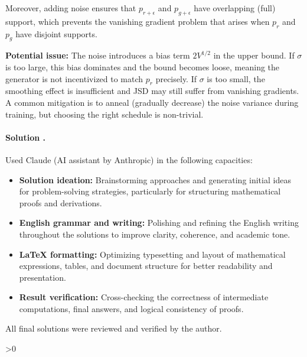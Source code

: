 \documentclass{article}
\newcounter{placeholderCount}
\newcounter{solutionCount}
\newcommand{\solution}[1]{
    \stepcounter{solutionCount}
    \paragraph{Solution \thesolutionCount.}
    {
        #1
    }
}
\begin{document}
{\begin{enumerate}
        Moreover, adding noise ensures that $p_{r+\epsilon}$ and $p_{g+\epsilon}$ have overlapping (full) support, which prevents the vanishing gradient problem that arises when $p_r$ and $p_g$ have disjoint supports.

        \textbf{Potential issue:} The noise introduces a bias term $2V^{1/2}$ in the upper bound. If $\sigma$ is too large, this bias dominates and the bound becomes loose, meaning the generator is not incentivized to match $p_r$ precisely. If $\sigma$ is too small, the smoothing effect is insufficient and JSD may still suffer from vanishing gradients. A common mitigation is to anneal (gradually decrease) the noise variance during training, but choosing the right schedule is non-trivial.
    \end{enumerate}
}


\solution{
    Used Claude (AI assistant by Anthropic) in the following capacities:
    \begin{itemize}
        \item \textbf{Solution ideation:} Brainstorming approaches and generating initial ideas for problem-solving strategies, particularly for structuring mathematical proofs and derivations.
        \item \textbf{English grammar and writing:} Polishing and refining the English writing throughout the solutions to improve clarity, coherence, and academic tone.
        \item \textbf{\LaTeX{} formatting:} Optimizing typesetting and layout of mathematical expressions, tables, and document structure for better readability and presentation.
        \item \textbf{Result verification:} Cross-checking the correctness of intermediate computations, final answers, and logical consistency of proofs.
    \end{itemize}
    All final solutions were reviewed and verified by the author.
}

\ifnum\value{placeholderCount}>0
    \vfill
    \begin{center}
        \color{red} 
    \end{center}
\fi
\end{document}
